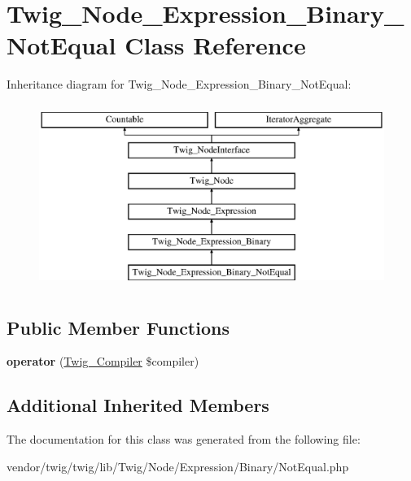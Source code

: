 \hypertarget{classTwig__Node__Expression__Binary__NotEqual}{}\section{Twig\+\_\+\+Node\+\_\+\+Expression\+\_\+\+Binary\+\_\+\+Not\+Equal Class Reference}
\label{classTwig__Node__Expression__Binary__NotEqual}
Inheritance diagram for Twig\+\_\+\+Node\+\_\+\+Expression\+\_\+\+Binary\+\_\+\+Not\+Equal\+:\begin{figure}[H]
\begin{center}
\leavevmode
\includegraphics[height=6.000000cm]{classTwig__Node__Expression__Binary__NotEqual}
\end{center}
\end{figure}
\subsection*{Public Member Functions}
\begin{DoxyCompactItemize}
\item 
{\bfseries operator} (\hyperlink{classTwig__Compiler}{Twig\+\_\+\+Compiler} \$compiler)\hypertarget{classTwig__Node__Expression__Binary__NotEqual_a529c0838cc0ee2ae42dbd5ef5f7c354c}{}\label{classTwig__Node__Expression__Binary__NotEqual_a529c0838cc0ee2ae42dbd5ef5f7c354c}

\end{DoxyCompactItemize}
\subsection*{Additional Inherited Members}


The documentation for this class was generated from the following file\+:\begin{DoxyCompactItemize}
\item 
vendor/twig/twig/lib/\+Twig/\+Node/\+Expression/\+Binary/Not\+Equal.\+php\end{DoxyCompactItemize}

